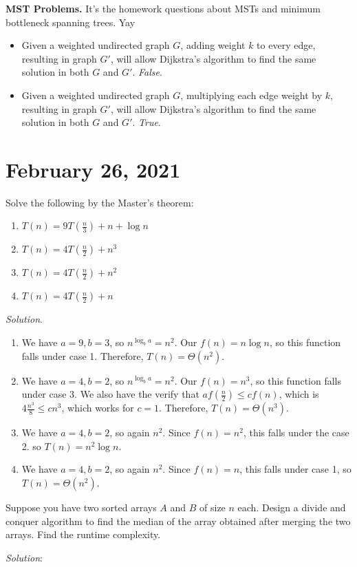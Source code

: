 \documentclass[11pt]{article}
\begin{document}
\begin{exmp}
    \textbf{MST Problems.} It's the homework questions about MSTs and minimum bottleneck spanning trees. Yay
\end{exmp}

\begin{exmp}
\begin{itemize}
    \item Given a weighted undirected graph $G$, adding weight $k$ to every edge, resulting in graph $G'$, will allow Dijkstra's algorithm to find the same solution in both $G$ and $G'$. \textit{False}.
    \item Given a weighted undirected graph $G$, multiplying each edge weight by $k$, resulting in graph $G'$, will allow Dijkstra's algorithm to find the same solution in both $G$ and $G'$. \textit{True}.

\end{itemize}
\end{exmp}

\newpage
\section{February 26, 2021}
\begin{exmp}
Solve the following by the Master's theorem:
\begin{enumerate}
    \item $T(n) = 9T(\frac{n}{3}) + n + \log n$
    \item $T(n) = 4T(\frac{n}{2}) + n^3$
    \item $T(n) = 4T(\frac{n}{2}) + n^2$
    \item $T(n) = 4T(\frac{n}{2}) + n$
\end{enumerate}
\end{exmp}
\textit{Solution}.
\begin{enumerate}
    \item We have $a = 9, b = 3$, so $n^{\log_b{a}} = n^2$. Our $f(n) = n \log n$, so this function falls under case 1. Therefore, $T(n) = \Theta(n^2)$.
    \item We have $a = 4, b = 2$, so $n^{\log_b{a}} = n^2$. Our $f(n) = n^3$, so this function falls under case 3. We also have the verify that $a f(\frac{n}{2}) \leq cf(n)$, which is $4 \frac{n^3}{8} \leq cn^3$, which works for $c = 1$. Therefore, $T(n) = \Theta(n^3)$.
    \item We have $a = 4, b = 2$, so again $n^2$. Since $f(n) = n^2$, this falls under the case 2. so $T(n) = n^2\log{n}$.
    \item We have $a = 4, b = 2$, so again $n^2$. Since $f(n) = n$, this falls under case 1, so $T(n) = \Theta(n^2)$.
\end{enumerate}
\begin{exmp}
Suppose you have two sorted arrays $A$ and $B$ of size $n$ each. Design a divide and conquer algorithm to find the median of the array obtained after merging the two arrays. Find the runtime complexity.
\end{exmp}
\textit{Solution}:
\end{document}
